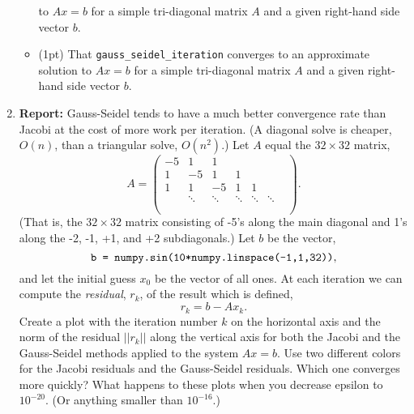 \documentclass[12pt]{article}
\begin{document}
\begin{enumerate}
\begin{itemize}
    to $Ax = b$ for a simple tri-diagonal matrix $A$ and a given right-hand side
    vector $b$.
  \item (1pt) That {\tt gauss\_seidel\_iteration} converges to an approximate
    solution to $Ax = b$ for a simple tri-diagonal matrix $A$ and a given
    right-hand side vector $b$.
  \end{itemize}
\item {\bf Report:} Gauss-Seidel tends to have a much better convergence rate
  than Jacobi at the cost of more work per iteration. (A diagonal solve is
  cheaper, $O(n)$, than a triangular solve, $O(n^2)$.) Let $A$ equal the $32
  \times 32$ matrix,
  \[
    A = 
    \begin{pmatrix}
      -5 & 1     & 1      &        &        & \\
      1 & -5     & 1      & 1      &        & \\
      1 & 1      & -5     & 1      & 1      & \\
        & \ddots & \ddots & \ddots & \ddots & \ddots \\
        & & & & & & \\
        & & & & & &
    \end{pmatrix}.
  \]
  (That is, the $32 \times 32$ matrix consisting of -5's along the main diagonal
  and 1's along the -2, -1, +1, and +2 subdiagonals.) Let $b$ be the vector,
  \[
    \text{\tt b = numpy.sin(10*numpy.linspace(-1,1,32))},
  \]
  and let the initial guess $x_0$ be the vector of all ones. At each iteration
  we can compute the {\it residual}, $r_k$, of the result which is defined,
  \[
    r_k = b - Ax_k.
  \]
  Create a plot with the iteration number $k$ on the horizontal axis and the
  norm of the residual $||r_k||$ along the vertical axis for both the Jacobi and
  the Gauss-Seidel methods applied to the system $Ax = b$. Use two different
  colors for the Jacobi residuals and the Gauss-Seidel residuals. Which one
  converges more quickly? What happens to these plots when you decrease epsilon
  to $10^{-20}$. (Or anything smaller than $10^{-16}$.)
\end{enumerate}


\end{document}
